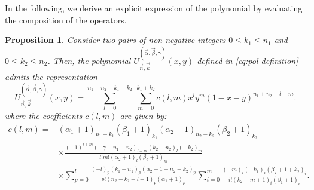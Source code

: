 \documentclass[11pt,reqno]{amsart}
\newtheorem{proposition}[theorem]{Proposition}
\theoremstyle{definition}
\begin{document}
In the following, we derive an explicit expression of the polynomial by evaluating the composition of the operators.

\begin{proposition}
    Consider two pairs of non-negative integers $0\leq k_1 \leq n_1$ and $0\leq k_2 \leq n_2$. Then, the polynomial $U_{\vec n, \vec k}^{(\vec \alpha, \vec \beta, \gamma)}(x,y)$ defined in \eqref{eq:pol-definition} admits the representation
    \begin{equation}
        \label{eq:explicit-formula}
        U_{\vec n, \vec k}^{(\vec \alpha, \vec \beta, \gamma)}(x,y) = \sum_{l=0}^{n_1+n_2-k_1-k_2}\ \sum_{m=0}^{k_1+k_2} c(l,m) x^l y^m (1-x-y)^{n_1+n_2-l-m}.
    \end{equation}
        where the coefficients $c(l,m)$ are given by:
    $$
    \begin{aligned}     
        \label{eq:coef-c}
        c(l,m)=&(\alpha_1+1)_{n_1-k_1} (\beta_1+1)_{k_1}
        (\alpha_2+1)_{n_2-k_2} (\beta_2+1)_{k_2}  
        \\
         &\times \frac{(-1)^{l+m} (-\gamma-n_1-n_2)_{l+m} (k_2-n_2)_l (-k_2)_m}{l! m! (\alpha_2 +1)_l (\beta_2+1)_m} 
         \\ 
         & \times \sum_{p=0}^l \frac{(-l)_p (k_1-n_1)_p (\alpha_2+1+n_2-k_2)_p}{p! (n_2-k_2-l+1)_p (\alpha_1+1)_p} 
         \sum_{i=0}^m \frac{(-m)_i (-k_1)_i (\beta_2+1+k_2)_i}{i! (k_2-m+1)_i (\beta_1+1)_i}.
    \end{aligned}
    $$
\end{proposition}
\end{document}
